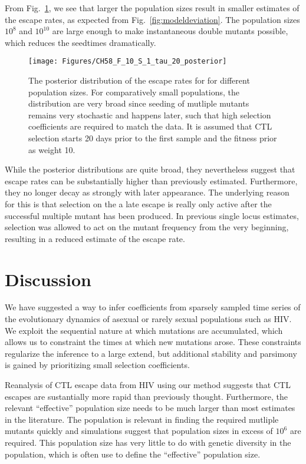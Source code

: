 \documentclass[rmp,twocolumn]{revtex4}
\newcommand{\FIG}[1]{Fig.~\ref{fig:#1}}
\begin{document}
From \FIG{patients}, we see that larger the population
sizes result in smaller estimates of the escape rates,  as expected from
\FIG{modeldeviation}.
The population sizes $10^8$ and $10^{10}$ are large enough to make instantaneous
double mutants possible, which reduces the seedtimes dramatically.

\begin{figure}[htp]
\begin{center}
  \texttt{[image: Figures/CH58\_F\_10\_S\_1\_tau\_20\_posterior]}
  \caption[labelInTOC]{The posterior distribution of the escape rates for
  for different population sizes. For comparatively small populations, the
  distribution are very broad since seeding of mutliple mutants remains very
  stochastic and happens later, such that high selection coefficients are
  required to match the data. It is assumed that CTL selection starts 20 days
  prior to the first sample and the fitness prior as weight 10.}
  \label{fig:patients}
\end{center}
\end{figure}


While the posterior distributions are quite broad, they nevertheless suggest
that escape rates can be substantially higher than previously estimated. Furthermore, they
no longer decay as strongly with later appearance. The underlying reason for
this is that selection on the a late escape is really only active after the
successful multiple mutant has been produced. In previous single locus
estimates, selection was allowed to act on the mutant frequency from the very
beginning, resulting in a reduced estimate of the escape rate. 

\section*{Discussion}
We have suggested a way to infer coefficients from sparsely sampled time series
of the evolutionary dynamics of asexual or rarely sexual populations such as
HIV. We exploit the sequential nature at which mutations are accumulated, which
allows us to constraint the times at which new mutations arose. These
constraints regularize the inference to a large extend, but additional stability
and parsimony is gained by prioritizing small selection coefficients.

Reanalysis of CTL escape data from HIV using our method suggests that CTL
escapes are sustantially more rapid than previously thought. Furthermore, the
relevant ``effective'' population size needs to be much larger than most
estimates in the literature. The population is relevant in finding the required
mutliple mutants quickly and simulations suggest that population sizes in excess of
$10^6$ are required. This population size has very little to do with genetic
diversity in the population, which is often use to define the ``effective''
population size. 
\end{document}
